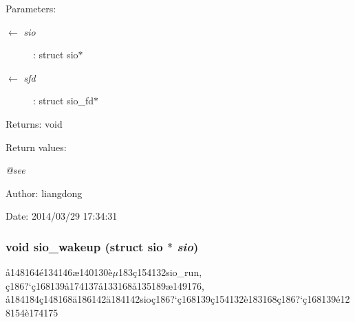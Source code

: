 \begin{Desc}
\item[Parameters:]
\begin{description}
\item[\mbox{$\leftarrow$} {\em sio}]: struct sio$\ast$ \item[\mbox{$\leftarrow$} {\em sfd}]: struct sio\_\-fd$\ast$ \end{description}
\end{Desc}
\begin{Desc}
\item[Returns:]void \end{Desc}
\begin{Desc}
\item[Return values:]
\begin{description}
\item[{\em @see}]\end{description}
\end{Desc}
\begin{Desc}
\item[Author:]liangdong \end{Desc}
\begin{Desc}
\item[Date:]2014/03/29 17:34:31 \end{Desc}
\subsubsection{\setlength{\rightskip}{0pt plus 5cm}void sio\_\-wakeup (struct sio $\ast$ {\em sio})}\label{sio_8c_a13}


\aa{}148164\'{e}134146\ae{}140130\`{e}$\mu$183\c{c}154132sio\_\-run, \c{c}186?`\c{c}168139\aa{}174137\aa{}133168\aa{}135189\ae{}149176, \aa{}184184\c{c}148168\"{a}186142\"{a}184142sio\c{c}186?`\c{c}168139\c{c}154132\`{e}183168\c{c}186?`\c{c}168139\'{e}128154\`{e}174175 

